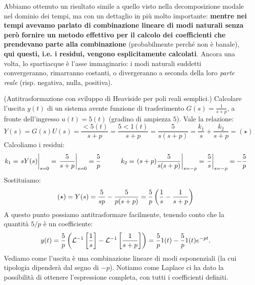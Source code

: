 Abbiamo ottenuto un risultato simile a quello visto nella decomposizione modale nel dominio dei tempi, ma con un dettaglio in più molto importante: \textbf{mentre nei tempi avevamo parlato di combinazione lineare di modi naturali senza però fornire un metodo effettivo per il calcolo dei coefficienti che prendevano parte alla combinazione} (probabilmente perché non è banale), \textbf{qui questi, i.e. i residui, vengono esplicitamente calcolati}.
\bb
Ancora una volta, lo spartiacque è l'asse immaginario: i modi naturali suddetti convergeranno, rimarranno costanti, o divergeranno a seconda della loro \textit{parte reale} (risp. negativa, nulla, positiva). 
\bb
\begin{minipage}
{0.5\textwidth}
\end{minipage}
\begin{minipage}
{0.5\textwidth}
\end{minipage}
\begin{esem} (Antitrasformazione con sviluppo di Heaviside per poli reali semplici.) Calcolare l'uscita $y(t)$ di un sistema avente funzione di trasferimento $G(s) = \frac{1}{s+p}$, a fronte dell'ingresso $u(t) = 5(t)$ (gradino di ampiezza $5$). Vale la relazione:
\begin{equation*}
Y(s) = G(s) U(s) =  \frac{\lt{5(t)}}{s+p} = \frac{5\lt{1(t)}}{s+p} = \frac{5}{s(s+p)} = \frac{k_1}{s} + \frac{k_2}{s+p} = (\star) 
\end{equation*}
Calcoliamo i residui:
\begin{equation*}
k_1 = \eval{sY(s)}_{s=0} = \eval{\frac{5}{s+p}}_{s=0} = \frac{5}{p} \quad \quad \quad k_2 = \eval{(s+p)\frac{5}{s(s+p)}}_{s=-p} = \eval{\frac{5}{s}}_{s=-p} = -\frac{5}{p}
\end{equation*}
Sostituiamo:
\begin{equation*}
(\star) = Y(s) = \frac{5}{sp} - \frac{5}{p(s+p)} = \frac{5}{p}\left( \frac{1}{s} - \frac{1}{s+p} \right)
\end{equation*}
A questo punto possiamo antitrasformare facilmente, tenendo conto che la quantità $5/p$ è un coefficiente:
\begin{equation*}
y(t) = \frac{5}{p}\left( \mathcal{L}^{-1}\left[ \frac{1}{s} \right] - \mathcal{L}^{-1}\left[ \frac{1}{s+p} \right] \right) = \frac{5}{p}1(t)-\frac{5}{p}1(t)e^{-pt}.
\end{equation*}
Vediamo come l'uscita è una combinazione lineare di modi esponenziali (la cui tipologia dipenderà dal segno di $-p$). Notiamo come Laplace ci ha dato la possibilità di ottenere l'espressione completa, con tutti i coefficienti definiti.
\end{esem}
